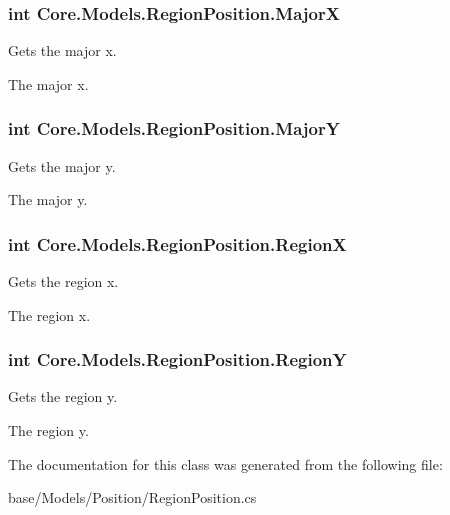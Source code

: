 \subsubsection[{Major\+X}]{\setlength{\rightskip}{0pt plus 5cm}int Core.\+Models.\+Region\+Position.\+Major\+X\hspace{0.3cm}{\ttfamily [get]}}\label{classCore_1_1Models_1_1RegionPosition_a98870c2d638d7d399b1ef1a922b91898}


Gets the major x. 

The major x.\hypertarget{classCore_1_1Models_1_1RegionPosition_a1a50c82dbe48a3fa60df6b9f44a71c2c}{}
\subsubsection[{Major\+Y}]{\setlength{\rightskip}{0pt plus 5cm}int Core.\+Models.\+Region\+Position.\+Major\+Y\hspace{0.3cm}{\ttfamily [get]}}\label{classCore_1_1Models_1_1RegionPosition_a1a50c82dbe48a3fa60df6b9f44a71c2c}


Gets the major y. 

The major y.\hypertarget{classCore_1_1Models_1_1RegionPosition_a3558f91a2b72169d93722b9787abdf10}{}
\subsubsection[{Region\+X}]{\setlength{\rightskip}{0pt plus 5cm}int Core.\+Models.\+Region\+Position.\+Region\+X\hspace{0.3cm}{\ttfamily [get]}}\label{classCore_1_1Models_1_1RegionPosition_a3558f91a2b72169d93722b9787abdf10}


Gets the region x. 

The region x.\hypertarget{classCore_1_1Models_1_1RegionPosition_ad6286a611b7ae561ac86a70dc68b10f2}{}
\subsubsection[{Region\+Y}]{\setlength{\rightskip}{0pt plus 5cm}int Core.\+Models.\+Region\+Position.\+Region\+Y\hspace{0.3cm}{\ttfamily [get]}}\label{classCore_1_1Models_1_1RegionPosition_ad6286a611b7ae561ac86a70dc68b10f2}


Gets the region y. 

The region y.

The documentation for this class was generated from the following file\+:\begin{DoxyCompactItemize}
\item 
base/\+Models/\+Position/Region\+Position.\+cs\end{DoxyCompactItemize}
